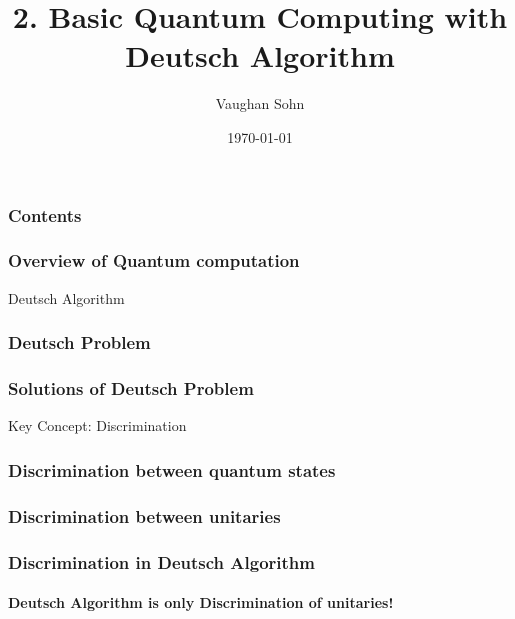 \documentclass[9pt]{beamer}
\title{2. Basic Quantum Computing with Deutsch Algorithm}
\date{\today}
\author{Vaughan Sohn}
\begin{document}
    \maketitle
    

    \begin{frame}
        \frametitle{Contents}
        \tableofcontents
    \end{frame}

    \begin{frame}
        \frametitle{Overview of Quantum computation}
        
    \end{frame}

    \begin{section}{Deutsch Algorithm}
        \begin{frame}
            \frametitle{Deutsch Problem}
            
        \end{frame}

        \begin{frame}
            \frametitle{Solutions of Deutsch Problem}
            
        \end{frame}
    \end{section}

    \begin{section}{Key Concept: Discrimination}
        \begin{frame}
            \frametitle{Discrimination between quantum states}
            
        \end{frame}

        \begin{frame}
            \frametitle{Discrimination between unitaries}
            
        \end{frame}

        \begin{frame}
            \frametitle{Discrimination in Deutsch Algorithm}
            \framesubtitle{Deutsch Algorithm is only Discrimination of unitaries!}
            
        \end{frame}
    \end{section}
\end{document}

